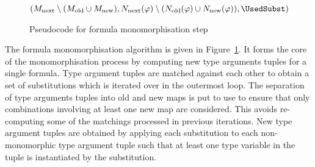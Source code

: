 \documentclass[runningheads]{llncs}
\begin{document}
\begin{figure}[t!]
\begin{algorithm}[H]
{   

   \BlankLine

   \Return \((M_{\text{next}}\setminus (M_{\text{old}} \cup M_{\text{new}}), N_{\text{next}}(\varphi)\setminus (N_{\text{old}}(\varphi)\cup N_{\text{new}}(\varphi)), \UsedSubst)\)
}

\end{algorithm}
\caption{Pseudocode for formula monomorphisation step}
\label{mono_step}
\end{figure}


The formula monomorphisation algorithm is given in Figure~\ref{mono_step}. It forms the core of the monomorphisation process by computing new type arguments tuples for a single formula. Type argument tuples are matched against each other to obtain a set of substitutions which is iterated over in the outermost loop. 
The separation of type arguments tuples into old and new maps is put to use to ensure that only combinations involving at least one new map are considered. This avoids re-computing some of the matchings processed in previous iterations. %
New type argument tuples are obtained by applying each substitution to each non-monomorphic type argument tuple such that at least one type variable in the tuple is instantiated by the substitution.
\end{document}
